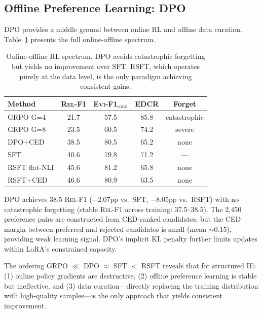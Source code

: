 \documentclass[11pt,a4paper]{article}
\newcommand{\evi}{\textsc{Evi-F1}}
\newcommand{\edcr}{\textsc{EDCR}}
\newcommand{\relf}{\textsc{Rel-F1}}
\begin{document}
\subsection{Offline Preference Learning: DPO}
\label{sec:dpo}

DPO provides a middle ground between online RL and offline data curation. Table~\ref{tab:online_offline} presents the full online-offline spectrum.

\begin{table}[t]
\centering
\small
\begin{tabular}{lcccc}
\toprule
\textbf{Method} & \textbf{\relf{}} & \textbf{\evi{}$_\text{cond}$} & \textbf{\edcr{}} & \textbf{Forget} \\
\midrule
GRPO G=4 & 21.7 & 57.5 & 85.8 & catastrophic \\
GRPO G=8 & 23.5 & 60.5 & 74.2 & severe \\
DPO+CED & 38.5 & 80.5 & 65.2 & none \\
SFT & 40.6 & 79.8 & 71.2 & --- \\
RSFT flat-NLI & 45.6 & 81.2 & 65.8 & none \\
RSFT+CED & 46.6 & 80.9 & 63.5 & none \\
\bottomrule
\end{tabular}
\caption{Online-offline RL spectrum. DPO avoids catastrophic forgetting but yields no improvement over SFT. RSFT, which operates purely at the data level, is the only paradigm achieving consistent gains.}
\label{tab:online_offline}
\end{table}

DPO achieves 38.5 \relf{} ($-2.07$pp vs.\ SFT, $-8.05$pp vs.\ RSFT) with no catastrophic forgetting (stable \relf{} across training: 37.5--38.5). The 2,450 preference pairs are constructed from CED-ranked candidates, but the CED margin between preferred and rejected candidates is small (mean $\sim$0.15), providing weak learning signal. DPO's implicit KL penalty further limits updates within LoRA's constrained capacity.

The ordering GRPO $\ll$ DPO $\approx$ SFT $<$ RSFT reveals that for structured IE: (1) online policy gradients are destructive, (2) offline preference learning is stable but ineffective, and (3) data curation---directly replacing the training distribution with high-quality samples---is the only approach that yields consistent improvement.
\end{document}
